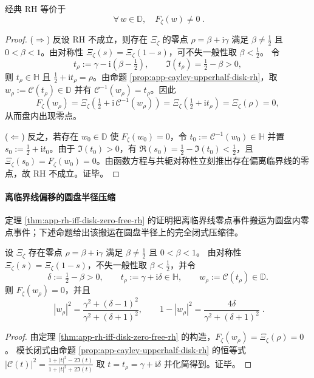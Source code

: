 \begin{theorem}\label{thm:app-rh-iff-disk-zero-free-rh}
经典 RH 等价于
$$
\boxed{\ \forall\,w\in\mathbb{D},\quad F_\zeta(w)\neq 0\ }.
$$
\end{theorem}
\begin{proof}
(\(\Rightarrow\)) 反设 RH 不成立，则存在 \(\Xi_\zeta\) 的零点 \(\rho=\beta+\mathrm{i}\gamma\) 满足 \(\beta\neq\tfrac12\) 且 \(0<\beta<1\)。由对称性 \(\Xi_\zeta(s)=\Xi_\zeta(1-s)\)，可不失一般性取 \(\beta<\tfrac12\)。
令
$$
t_\rho:=\gamma-\mathrm{i}\left(\beta-\tfrac12\right),
\qquad
\Im(t_\rho)=\tfrac12-\beta>0,
$$
则 \(t_\rho\in\mathbb{H}\) 且 \(\tfrac12+\mathrm{i}t_\rho=\rho\)。由命题 \ref{prop:app-cayley-upperhalf-disk-rh}，取 \(w_\rho:=\mathcal{C}(t_\rho)\in\mathbb{D}\) 并有 \(\mathcal{C}^{-1}(w_\rho)=t_\rho\)。因此
$$
F_\zeta(w_\rho)=\Xi_\zeta\!\left(\tfrac12+\mathrm{i}\,\mathcal{C}^{-1}(w_\rho)\right)
=\Xi_\zeta\!\left(\tfrac12+\mathrm{i}t_\rho\right)
=\Xi_\zeta(\rho)=0,
$$
从而盘内出现零点。
\par
(\(\Leftarrow\)) 反之，若存在 \(w_0\in\mathbb{D}\) 使 \(F_\zeta(w_0)=0\)，令 \(t_0:=\mathcal{C}^{-1}(w_0)\in\mathbb{H}\) 并置 \(s_0:=\tfrac12+\mathrm{i}t_0\)。由于 \(\Im(t_0)>0\)，有 \(\Re(s_0)=\tfrac12-\Im(t_0)<\tfrac12\)，且 \(\Xi_\zeta(s_0)=F_\zeta(w_0)=0\)。由函数方程与共轭对称性立刻推出存在偏离临界线的零点，故 RH 不成立。证毕。
\end{proof}

\paragraph{离临界线偏移的圆盘半径压缩}
定理 \ref{thm:app-rh-iff-disk-zero-free-rh} 的证明把离临界线零点事件搬运为圆盘内零点事件；下述命题给出该搬运在圆盘半径上的完全闭式压缩律。

\begin{proposition}[离临界线偏移的圆盘半径闭式压缩]\label{prop:app-offcritical-radius-compression-rh}
设 \(\Xi_\zeta\) 存在零点 \(\rho=\beta+\mathrm{i}\gamma\) 满足 \(\beta\neq\tfrac12\) 且 \(0<\beta<1\)。
由对称性 \(\Xi_\zeta(s)=\Xi_\zeta(1-s)\)，不失一般性取 \(\beta<\tfrac12\)，并令
$$
\delta:=\tfrac12-\beta>0,
\qquad
t_{\rho}:=\gamma+\mathrm{i}\delta\in\mathbb{H},
\qquad
w_{\rho}:=\mathcal{C}(t_{\rho})\in\mathbb{D}.
$$
则 \(F_\zeta(w_{\rho})=0\)，并且
$$
\boxed{\;
|w_{\rho}|^{2}
=\frac{\gamma^{2}+(\delta-1)^{2}}{\gamma^{2}+(\delta+1)^{2}},
\qquad
1-|w_{\rho}|^{2}
=\frac{4\delta}{\gamma^{2}+(\delta+1)^{2}}\; }.
$$
\end{proposition}
\begin{proof}
由定理 \ref{thm:app-rh-iff-disk-zero-free-rh} 的构造，\(F_\zeta(w_{\rho})=\Xi_\zeta(\rho)=0\)。
模长闭式由命题 \ref{prop:app-cayley-upperhalf-disk-rh} 的恒等式
\(
|\mathcal{C}(t)|^{2}=\frac{1+|t|^{2}-2\Im(t)}{1+|t|^{2}+2\Im(t)}
\)
取 \(t=t_{\rho}=\gamma+\mathrm{i}\delta\) 并化简得到。证毕。
\end{proof}

